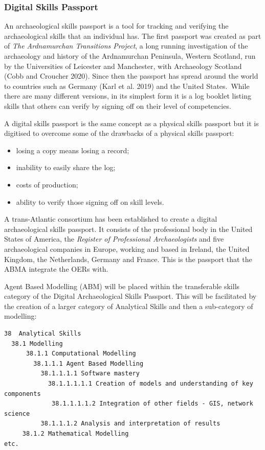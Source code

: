 \documentclass[
]{article}
\begin{document}
\hypertarget{digital-skills-passport}{%
\subsubsection{Digital Skills Passport}\label{digital-skills-passport}}

An archaeological skills passport is a tool for tracking and verifying the archaeological skills that an individual has. The first passport was created as part of \emph{The Ardnamurchan Transitions Project}, a long running investigation of the archaeology and history of the Ardnamurchan Peninsula, Western Scotland, run by the Universities of Leicester and Manchester, with Archaeology Scotland (Cobb and Croucher 2020). Since then the passport has spread around the world to countries such as Germany (Karl et al. 2019) and the United States.~While there are many different versions, in its simplest form it is a log booklet listing skills that others can verify by signing off on their level of competencies.~

A digital skills passport is the same concept as a physical skills passport but it is digitised to overcome some of the drawbacks of a physical skills passport:

\begin{itemize}
\item
  losing a copy means losing a record;
\item
  inability to easily share the log;
\item
  costs of production;
\item
  ability to verify those signing off on skill levels.~
\end{itemize}

A trans-Atlantic consortium has been established to create a digital archaeological skills passport. It consists of the professional body in the United States of America, the \emph{Register of Professional Archaeologists} and five archaeological companies in Europe, working and based in Ireland, the United Kingdom, the Netherlands, Germany and France. This is the passport that the ABMA integrate the OERs with.~

Agent Based Modelling (ABM) will be placed within the transferable skills category of the Digital Archaeological Skills Passport. This will be facilitated by the creation of a larger category of Analytical Skills and then a sub-category of modelling:

\begin{verbatim}
38  Analytical Skills
  38.1 Modelling
      38.1.1 Computational Modelling
        38.1.1.1 Agent Based Modelling
          38.1.1.1.1 Software mastery
            38.1.1.1.1.1 Creation of models and understanding of key components
             38.1.1.1.1.2 Integration of other fields - GIS, network science
          38.1.1.1.2 Analysis and interpretation of results
     38.1.2 Mathematical Modelling
etc.
\end{verbatim}
\end{document}
